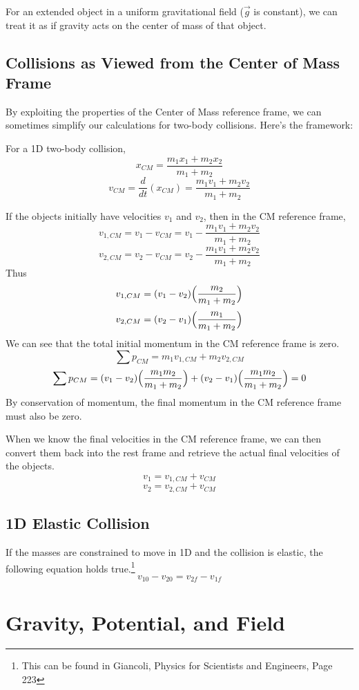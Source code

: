 \documentclass[11pt]{article}
\theoremstyle{gangnamstyle}{\newtheorem{definition}{Definition}[]}
\theoremstyle{gangnamstyle}{\newtheorem{example}{Example}[]}
\theoremstyle{gangnamstyle}{\newtheorem{problem}{Problem}[]}
\begin{document}
For an extended object in a uniform gravitational field ($\Vec{g}$ is constant), we can treat it as if gravity acts on the center of mass of that object. 

\pagebreak

\subsection{Collisions as Viewed from the Center of Mass Frame}

By exploiting the properties of the Center of Mass reference frame, we can sometimes simplify our calculations for two-body collisions. Here's the framework: 

For a 1D two-body collision, 
\[ x_{CM} = \frac{m_1x_1 + m_2x_2}{m_1 + m_2} \]
\[ v_{CM} = \frac{d}{dt}(x_{CM}) = \frac{m_1v_1 + m_2v_2}{m_1 + m_2} \]

If the objects initially have velocities $v_1$ and $v_2$, then in the CM reference frame, 
\[ v_{1, CM} = v_1 - v_{CM} = v_1 - \frac{m_1v_1 + m_2v_2}{m_1 + m_2} \]
\[ v_{2, CM} = v_2 - v_{CM} = v_2 - \frac{m_1v_1 + m_2v_2}{m_1 + m_2} \]
Thus
\[ v_{1, CM} = (v_1 - v_2) \Bigl(\frac{m_2}{m_1 + m_2}\Bigr) \]
\[ v_{2, CM} = (v_2 - v_1) \Bigl(\frac{m_1}{m_1 + m_2}\Bigr) \]
We can see that the total initial momentum in the CM reference frame is zero. 
\[ \sum p_{CM} = m_1v_{1, CM} + m_2v_{2, CM} \]
\[ \sum p_{CM} = (v_1 - v_2) \Bigl(\frac{m_1m_2}{m_1 + m_2}\Bigr) + (v_2 - v_1) \Bigl(\frac{m_1m_2}{m_1 + m_2}\Bigr) = 0 \]
By conservation of momentum, the final momentum in the CM reference frame must also be zero. 

When we know the final velocities in the CM reference frame, we can then convert them back into the rest frame and retrieve the actual final velocities of the objects.
\[ v_1 = v_{1, CM} + v_{CM} \]
\[ v_2 = v_{2, CM} + v_{CM} \]

\subsection{1D Elastic Collision}

If the masses are constrained to move in 1D and the collision is elastic, the following equation holds true.\footnote{This can be found in Giancoli, Physics for Scientists and Engineers, Page 223}
\[ v_{10} - v_{20} = v_{2f} - v_{1f} \]

\pagebreak

\section{Gravity, Potential, and Field}
\end{document}
